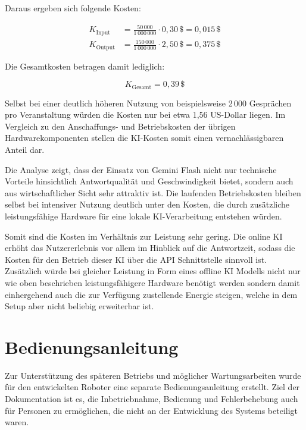 Daraus ergeben sich folgende Kosten:

\begin{align}
	K_{\text{Input}} &= \frac{50\,000}{1\,000\,000} \cdot 0{,}30 \,\$ = 0{,}015 \,\$ \\
	K_{\text{Output}} &= \frac{150\,000}{1\,000\,000} \cdot 2{,}50 \,\$ = 0{,}375 \,\$
\end{align}

Die Gesamtkosten betragen damit lediglich:

\begin{equation}
	K_{\text{Gesamt}} = 0{,}39 \,\$
\end{equation}

Selbst bei einer deutlich höheren Nutzung von beispielsweise 2\,000 Gesprächen pro Veranstaltung würden die Kosten nur bei etwa 1,56 US-Dollar liegen. Im Vergleich zu den Anschaffungs- und Betriebskosten der übrigen Hardwarekomponenten stellen die KI-Kosten somit einen vernachlässigbaren Anteil dar.

Die Analyse zeigt, dass der Einsatz von Gemini Flash nicht nur technische Vorteile hinsichtlich Antwortqualität und Geschwindigkeit bietet, sondern auch aus wirtschaftlicher Sicht sehr attraktiv ist. Die laufenden Betriebskosten bleiben selbst bei intensiver Nutzung deutlich unter den Kosten, die durch zusätzliche leistungsfähige Hardware für eine lokale KI-Verarbeitung entstehen würden.

Somit sind die Kosten im Verhältnis zur Leistung sehr gering. Die online KI erhöht das Nutzererlebnis vor allem im Hinblick auf die Antwortzeit, sodass die Kosten für den Betrieb dieser KI über die API Schnittstelle sinnvoll ist.
Zusätzlich würde bei gleicher Leistung in Form eines offline KI Modells nicht nur wie oben beschrieben leistungsfähigere Hardware benötigt werden sondern damit einhergehend auch die zur Verfügung zustellende Energie steigen, welche in dem Setup aber nicht beliebig erweiterbar ist.
\newpage

\chapter{Bedienungsanleitung}
\label{cha:Bedienungsanleitung}

Zur Unterstützung des späteren Betriebs und möglicher Wartungsarbeiten wurde für den entwickelten Roboter eine separate Bedienungsanleitung erstellt. Ziel der Dokumentation ist es, die Inbetriebnahme, Bedienung und Fehlerbehebung auch für Personen zu ermöglichen, die nicht an der Entwicklung des Systems beteiligt waren.

